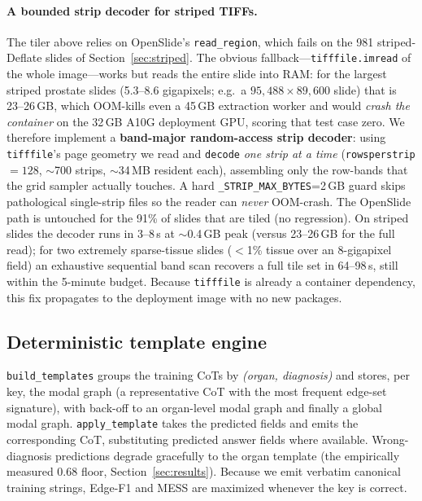 \documentclass[11pt,a4paper]{article}
\newcommand{\code}[1]{\texttt{\small #1}}
\begin{document}
\paragraph{A bounded strip decoder for striped TIFFs.}
The tiler above relies on OpenSlide's \code{read\_region}, which fails on the 981 striped-Deflate
slides of Section~\ref{sec:striped}. The obvious fallback---\code{tifffile.imread} of the whole
image---works but reads the entire slide into RAM: for the largest striped prostate slides
(5.3--8.6 gigapixels; e.g.\ a $95{,}488\times89{,}600$ slide) that is 23--26\,GB, which OOM-kills
even a 45\,GB extraction worker and would \emph{crash the container} on the 32\,GB A10G deployment
GPU, scoring that test case zero. We therefore implement a \textbf{band-major random-access strip
decoder}: using \code{tifffile}'s page geometry we read and \code{decode} \emph{one strip at a
time} (\code{rowsperstrip}$=128$, $\sim$700 strips, $\sim$34\,MB resident each), assembling only
the row-bands that the grid sampler actually touches. A hard \code{\_STRIP\_MAX\_BYTES}=2\,GB guard
skips pathological single-strip files so the reader can \emph{never} OOM-crash. The OpenSlide path
is untouched for the 91\% of slides that are tiled (no regression). On striped slides the decoder
runs in 3--8\,s at $\sim$0.4\,GB peak (versus 23--26\,GB for the full read); for two extremely
sparse-tissue slides ($<$1\% tissue over an 8-gigapixel field) an exhaustive sequential band scan
recovers a full tile set in 64--98\,s, still within the 5-minute budget. Because \code{tifffile} is
already a container dependency, this fix propagates to the deployment image with no new packages.

\subsection{Deterministic template engine}
\code{build\_templates} groups the training CoTs by \emph{(organ, diagnosis)} and stores, per
key, the modal graph (a representative CoT with the most frequent edge-set signature), with
back-off to an organ-level modal graph and finally a global modal graph.
\code{apply\_template} takes the predicted fields and emits the corresponding CoT, substituting
predicted answer fields where available. Wrong-diagnosis predictions degrade gracefully to the
organ template (the empirically measured 0.68 floor, Section~\ref{sec:results}). Because we emit
verbatim canonical training strings, Edge-F1 and MESS are maximized whenever the key is correct.
\end{document}
